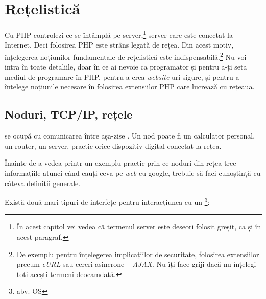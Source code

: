 \chapter{Rețelistică}

\begin{chapsummary}
Cu PHP controlezi ce se întâmplă pe server,\footnote{În acest
capitol vei vedea că termenul {\glqq}server{\grqq} este deseori folosit greșit,
ca și în acest paragraf.} server care
este conectat la Internet.
Deci folosirea PHP este strâns legată
de rețea. Din acest motiv, înțelegerea noțiunilor fundamentale de
rețelistică este indispensabilă.\footnote{De exemplu pentru 
înțelegerea implicațiilor de securitate, folosirea extensiilor
precum \textsl{cURL} sau cereri asincrone -- \textsl{AJAX}. Nu îți face griji dacă
nu înțelegi toți acești termeni deocamdată.}
Nu voi intra în toate detaliile, doar în ce ai nevoie ca programator
și pentru a-ți seta mediul de programare în PHP, pentru a crea
\textsl{website}-uri sigure, și pentru a înțelege noțiunile
necesare în folosirea extensiilor PHP care lucrează cu rețeaua.
\end{chapsummary}


\section{Noduri, TCP/IP, rețele}
 se ocupă cu comunicarea între
așa-zise . Un nod poate fi un calculator
personal, un router, un server, practic orice dispozitiv digital
conectat la rețea.

Înainte de a vedea printr-un exemplu practic prin ce noduri
din rețea trec informațiile
atunci când cauți ceva pe \textsl{web} cu google, trebuie să faci
cunoștință cu câteva definiții generale.

Există două mari tipuri de interfețe pentru interacțiunea cu un 
\footnote{abv. OS}:

